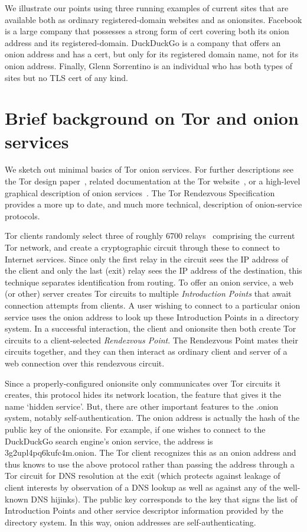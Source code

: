 \documentclass[10pt]{styles/IEEEtran}
\begin{document}
We illustrate our points using three running examples
of current sites that are available both as ordinary registered-domain
websites and as onionsites. Facebook is a large company that
possesses a strong form of cert covering both its onion address and its
registered-domain. DuckDuckGo is a company that offers an
onion address and has a cert, but only for its registered domain name,
not for its onion address.  Finally, Glenn Sorrentino is an
individual who has both types of sites but no TLS cert of any kind.

\section{Brief background on Tor and onion services}

We sketch out minimal basics of Tor onion services. For further
descriptions see the Tor design paper~\cite{tor-design}, related
documentation at the Tor website~\cite{torproject}, or a high-level
graphical description of onion services~\cite{tor-hs}. The Tor
Rendezvous Specification~\cite{tor-rend-spec} provides a more up to
date, and much more technical, description of onion-service
protocols.

Tor clients randomly select three of roughly 6700 relays~\cite{tor-network-size}
comprising the current Tor network, and create a cryptographic circuit
through these to connect to Internet services. Since only the first
relay in the circuit sees the IP address of the client and
only the last (exit) relay sees the IP address of the destination,
this technique separates identification from routing.
To offer an onion service, a web (or other) server creates Tor circuits to
multiple \emph{Introduction Points} that await connection attempts
from clients. A user wishing to connect to a particular onion service
uses the onion address to look up these Introduction Points in a
directory system. In a successful interaction, the client and
onionsite then both create Tor circuits to a client-selected
\emph{Rendezvous Point}. The Rendezvous Point mates their circuits
together, and they can then interact as ordinary client and server of
a web connection over this rendezvous circuit.

Since a properly-configured onionsite only communicates over Tor
circuits it creates,
this protocol hides its network location, the feature that
gives it the name `hidden service'. But, there are other important
features to the .onion system, notably self-authentication. The onion
address is actually the hash of the public key of the onionsite. 
For example, if one wishes to connect to the DuckDuckGo search engine's
onion service, the address is 3g2upl4pq6kufc4m.onion. The Tor client
recognizes this as an onion address and thus knows to use the above
protocol rather than passing the address through a Tor
circuit for DNS resolution at the exit (which protects against leakage
of client interests by observation of a DNS lookup as well as against
any of the well-known DNS hijinks). The public key corresponds to the
key that signs the list of Introduction Points and other service
descriptor information provided by the directory system. In this way,
onion addresses are self-authenticating.
\end{document}
